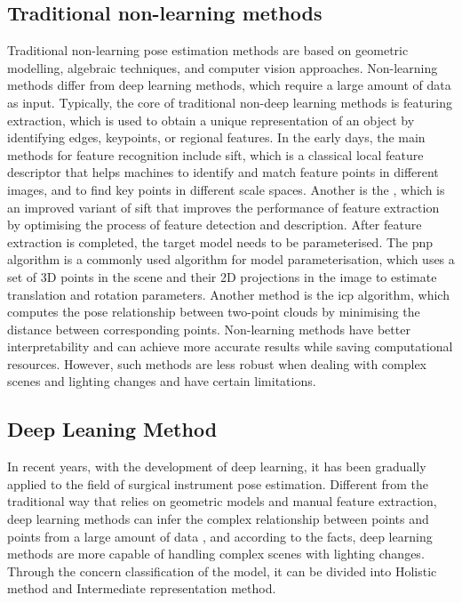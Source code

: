 \documentclass[12pt]{article}
\begin{document}
\subsection{Traditional non-learning methods}
Traditional non-learning pose estimation methods are based on geometric modelling, algebraic techniques, and computer vision approaches\cite{fan2024reinforcement}. Non-learning methods differ from deep learning methods, which require a large amount of data as input. Typically, the core of traditional non-deep learning methods is featuring extraction, which is used to obtain a unique representation of an object by identifying edges, keypoints, or regional features\cite{fan2024reinforcement}. In the early days, the main methods for feature recognition include \gls{sift}\cite{lakshmi2017image}, which is a classical local feature descriptor that helps machines to identify and match feature points in different images, and to find key points in different scale spaces. Another is the \cite{wijesinghe2010speed}, which is an improved variant of \gls{sift} that improves the performance of feature extraction by optimising the process of feature detection and description.
After feature extraction is completed, the target model needs to be parameterised. The \gls{pnp}\cite{[yun2017object,lu2018review} algorithm is a commonly used algorithm for model parameterisation, which uses a set of 3D points in the scene and their 2D projections in the image to estimate translation and rotation parameters. Another method is the \gls{icp} algorithm\cite{bellekens2014survey}, which computes the pose relationship between two-point clouds by minimising the distance between corresponding points.
Non-learning methods have better interpretability and can achieve more accurate results while saving computational resources. However, such methods are less robust when dealing with complex scenes and lighting changes and have certain limitations\cite{bellekens2014survey}.

\subsection{Deep Leaning Method}
In recent years, with the development of deep learning, it has been gradually applied to the field of surgical instrument pose estimation. Different from the traditional way that relies on geometric models and manual feature extraction, deep learning methods can infer the complex relationship between points and points from a large amount of data \cite{ bellekens2014survey}, and according to the facts, deep learning methods are more capable of handling complex scenes with lighting changes\cite{fan2024reinforcement}. Through the concern classification of the model, it can be divided into Holistic method and Intermediate representation method.
\end{document}
